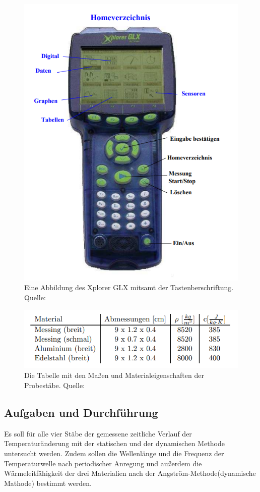 \begin{figure}[H]
    \centering
    \includegraphics[scale=0.6]{content/GLX.png}
    \caption{Eine Abbildung des Xplorer GLX mitsamt der Tastenberschriftung. Quelle:\cite{sample}}
    \label{fig:GLX}
\end{figure}
\begin{figure}[H]
    \centering
    \includegraphics[scale=1]{content/StabDaten.png}
    \caption{Die Tabelle mit den Maßen und Materialeigenschaften der Probestäbe. Quelle:\cite{sample}}
    \label{fig:Masse}
\end{figure}
\subsection{Aufgaben und Durchführung}
\label{subsec:AufgDurch}
Es soll für alle vier Stäbe der gemessene zeitliche Verlauf der Temperaturänderung mit der statischen und
der dynamischen Methode untersucht werden. Zudem sollen die Wellenlänge und die Frequenz der Temperaturwelle
nach periodischer Anregung und außerdem die Wärmeleitfähigkeit der drei Materialien nach
der Angström-Methode(dynamische Mathode) bestimmt werden.
